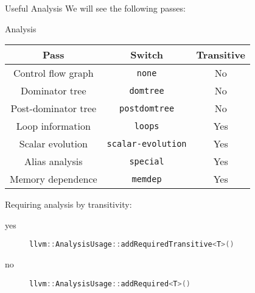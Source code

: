 \documentclass[10pt,mathserif]{beamer}
\newcommand{\cppinline}[1]{\lstinline[language=C++]!#1!}
\begin{document}
\begin{frame}{Useful Analysis}
We will see the following passes:

\begin{block}{Analysis}
\centering
\begin{tabular}{ccc}
\toprule

\multicolumn{1}{c}{\textbf{Pass}}        &
\multicolumn{1}{c}{\textbf{Switch}}      &
\multicolumn{1}{c}{\textbf{Transitive}} \\

\midrule

Control flow graph  &
\texttt{none}       & 
No                 \\

Dominator tree    &
\texttt{domtree}  &
No               \\

Post-dominator tree   &
\texttt{postdomtree}  &
No                   \\

Loop information  &
\texttt{loops}    &
Yes              \\

Scalar evolution           &
\texttt{scalar-evolution}  &
Yes                       \\

Alias analysis    &
\texttt{special}  &
Yes              \\

Memory dependence  &
\texttt{memdep}    &
Yes               \\

\bottomrule
\end{tabular}
\end{block}

Requiring analysis by transitivity:

\begin{description}
\item[yes] \cppinline{llvm::AnalysisUsage::addRequiredTransitive<T>()}
\item[no] \cppinline{llvm::AnalysisUsage::addRequired<T>()}
\end{description}
\end{frame}
\end{document}
